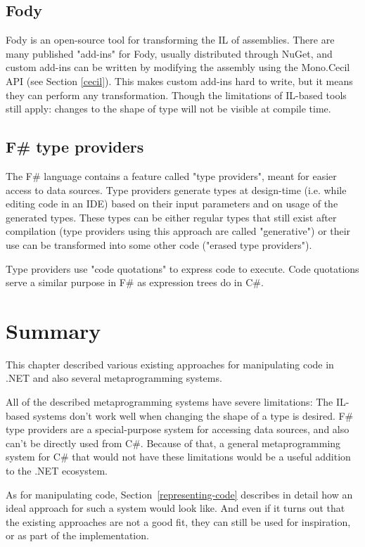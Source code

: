 \subsection{Fody}

Fody \cite{fody} is an open-source tool for transforming the \ac{IL} of assemblies. There are many published "add-ins" for Fody, usually distributed through NuGet, and custom add-ins can be written by modifying the assembly using the Mono.Cecil \ac{API} (see Section \ref{cecil}). This makes custom add-ins hard to write, but it means they can perform any transformation. Though the limitations of \ac{IL}-based tools still apply: changes to the shape of type will not be visible at compile time.

\subsection{F\# type providers}

The F\# language contains a feature called "type providers", \cite{type-providers} meant for easier access to data sources. Type providers generate types at design-time (i.e. while editing code in an \ac{IDE}) based on their input parameters and on usage of the generated types. These types can be either regular types that still exist after compilation (type providers using this approach are called "generative") or their use can be transformed into some other code ("erased type providers").

Type providers use "code quotations" to express code to execute. Code quotations serve a similar purpose in F\# as expression trees do in C\#.

\section{Summary}

This chapter described various existing approaches for manipulating code in .NET and also several metaprogramming systems.

All of the described metaprogramming systems have severe limitations: The \ac{IL}-based systems don't work well when changing the shape of a type is desired. F\# type providers are a special-purpose system for accessing data sources, and also can't be directly used from C\#. Because of that, a general metaprogramming system for C\# that would not have these limitations would be a useful addition to the .NET ecosystem.

As for manipulating code, Section~\ref{representing-code} describes in detail how an ideal approach for such a system would look like. And even if it turns out that the existing approaches are not a good fit, they can still be used for inspiration, or as part of the implementation.